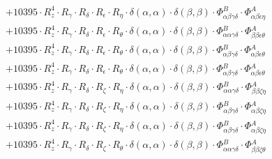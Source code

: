 \documentclass{article}
\begin{document}
\begin{subequations}
\begin{gather}
\begin{array}{c}
 \\[0.2em] 		 + 10395 \cdot R_{z}^{4} \cdot R_{\gamma{}} \cdot R_{\delta{}} \cdot R_{\epsilon{}} \cdot R_{\eta{}} \cdot \delta{}\left(\alpha{}, \alpha{}\right) \cdot \delta{}\left(\beta{}, \beta{}\right) \cdot \Phi{}^{B}_{\alpha{}\beta{}\gamma{}\delta{}} \cdot \Phi{}^{A}_{\alpha{}\beta{}\epsilon{}\eta{}} 
 \\[0.2em] 		 + 10395 \cdot R_{z}^{4} \cdot R_{\gamma{}} \cdot R_{\delta{}} \cdot R_{\epsilon{}} \cdot R_{\theta{}} \cdot \delta{}\left(\alpha{}, \alpha{}\right) \cdot \delta{}\left(\beta{}, \beta{}\right) \cdot \Phi{}^{B}_{\alpha{}\alpha{}\gamma{}\delta{}} \cdot \Phi{}^{A}_{\beta{}\beta{}\epsilon{}\theta{}} 
 \\[0.2em] 		 + 10395 \cdot R_{z}^{4} \cdot R_{\gamma{}} \cdot R_{\delta{}} \cdot R_{\epsilon{}} \cdot R_{\theta{}} \cdot \delta{}\left(\alpha{}, \alpha{}\right) \cdot \delta{}\left(\beta{}, \beta{}\right) \cdot \Phi{}^{B}_{\alpha{}\beta{}\gamma{}\delta{}} \cdot \Phi{}^{A}_{\alpha{}\beta{}\epsilon{}\theta{}} 
 \\[0.2em] 		 + 10395 \cdot R_{z}^{4} \cdot R_{\gamma{}} \cdot R_{\delta{}} \cdot R_{\epsilon{}} \cdot R_{\theta{}} \cdot \delta{}\left(\alpha{}, \alpha{}\right) \cdot \delta{}\left(\beta{}, \beta{}\right) \cdot \Phi{}^{B}_{\alpha{}\beta{}\gamma{}\delta{}} \cdot \Phi{}^{A}_{\alpha{}\beta{}\epsilon{}\theta{}} 
 \\[0.2em] 		 + 10395 \cdot R_{z}^{4} \cdot R_{\gamma{}} \cdot R_{\delta{}} \cdot R_{\zeta{}} \cdot R_{\eta{}} \cdot \delta{}\left(\alpha{}, \alpha{}\right) \cdot \delta{}\left(\beta{}, \beta{}\right) \cdot \Phi{}^{B}_{\alpha{}\alpha{}\gamma{}\delta{}} \cdot \Phi{}^{A}_{\beta{}\beta{}\zeta{}\eta{}} 
 \\[0.2em] 		 + 10395 \cdot R_{z}^{4} \cdot R_{\gamma{}} \cdot R_{\delta{}} \cdot R_{\zeta{}} \cdot R_{\eta{}} \cdot \delta{}\left(\alpha{}, \alpha{}\right) \cdot \delta{}\left(\beta{}, \beta{}\right) \cdot \Phi{}^{B}_{\alpha{}\beta{}\gamma{}\delta{}} \cdot \Phi{}^{A}_{\alpha{}\beta{}\zeta{}\eta{}} 
 \\[0.2em] 		 + 10395 \cdot R_{z}^{4} \cdot R_{\gamma{}} \cdot R_{\delta{}} \cdot R_{\zeta{}} \cdot R_{\eta{}} \cdot \delta{}\left(\alpha{}, \alpha{}\right) \cdot \delta{}\left(\beta{}, \beta{}\right) \cdot \Phi{}^{B}_{\alpha{}\beta{}\gamma{}\delta{}} \cdot \Phi{}^{A}_{\alpha{}\beta{}\zeta{}\eta{}} 
 \\[0.2em] 		 + 10395 \cdot R_{z}^{4} \cdot R_{\gamma{}} \cdot R_{\delta{}} \cdot R_{\zeta{}} \cdot R_{\theta{}} \cdot \delta{}\left(\alpha{}, \alpha{}\right) \cdot \delta{}\left(\beta{}, \beta{}\right) \cdot \Phi{}^{B}_{\alpha{}\alpha{}\gamma{}\delta{}} \cdot \Phi{}^{A}_{\beta{}\beta{}\zeta{}\theta{}} 

\end{array}
\end{gather}
\end{subequations}
\end{document}
